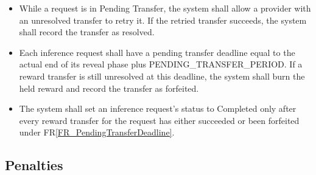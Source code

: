 \documentclass[12pt]{article}
\newcounter{reqnum} %
\newcommand{\rref}[1]{FR\ref{#1}}
\begin{document}
\begin{itemize}
\item[FR\refstepcounter{reqnum}\thereqnum \label{FR_PendingTransferRetry}:] While a request is in Pending Transfer, the system shall allow a provider with an unresolved transfer to retry it. If the retried transfer succeeds, the system shall record the transfer as resolved.

\item[FR\refstepcounter{reqnum}\thereqnum \label{FR_PendingTransferDeadline}:] Each inference request shall have a pending transfer deadline equal to the actual end of its reveal phase plus PENDING\_TRANSFER\_PERIOD. If a reward transfer is still unresolved at this deadline, the system shall burn the held reward and record the transfer as forfeited.

\item[FR\refstepcounter{reqnum}\thereqnum \label{FR_RequestCompletion}:] The system shall set an inference request's status to Completed only after every reward transfer for the request has either succeeded or been forfeited under \rref{FR_PendingTransferDeadline}.
\end{itemize}

\subsection{Penalties}
\end{document}
